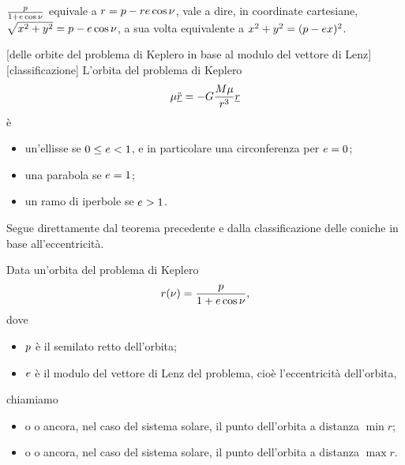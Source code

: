 \Proof $\frac{p}{1 + e \cos{\nu}}$ equivale a $r = p - r e\cos{\nu}$, vale a dire, in coordinate cartesiane, $\sqrt{x^2 + y^2} = p - e\cos{\nu}$, a sua volta equivalente a $x^2 + y^2 = (p - e x)^2$. \EndProof
\begin{Corollary}
	[delle orbite del problema di Keplero in base al modulo del vettore di Lenz][classificazione]
	L'orbita del problema di Keplero
	\[
		\mu \ddot{\underline{r}} = - G \frac{M\mu}{r^3}\underline{r}
	\]
	\`e
	\begin{itemize}
		\item un'ellisse se $0 \leq e < 1$, e in particolare una circonferenza per $e = 0$;
		\item una parabola se $e = 1$;
		\item un ramo di iperbole se $e > 1$.
	\end{itemize}
\end{Corollary}
\Proof Segue direttamente dal teorema precedente e dalla classificazione delle coniche in base all'eccentricit\`a. \EndProof
\begin{Definition}
	Data un'orbita del problema di Keplero
	\[
		r(\nu) = \frac{p}{1 + e \cos{\nu}},
	\]
	dove
	\begin{itemize}
		\item $p$ \`e il semilato retto dell'orbita;
		\item $e$ \`e il modulo del vettore di Lenz del problema, cio\`e l'eccentricit\`a dell'orbita,
	\end{itemize}
	chiamiamo
	\begin{itemize}
		\item {} o  o ancora, nel
      caso del sistema solare,  il punto dell'orbita a
      distanza $\min r$;
		\item {} o  o ancora, nel caso del
      sistema solare,  il punto dell'orbita a distanza
      $\max r$.
	\end{itemize}
\end{Definition}
